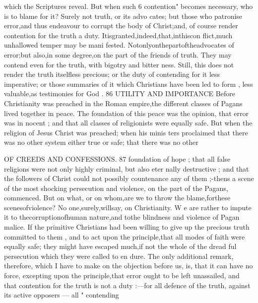 \documentclass[
]{book}
\begin{document}
which the Scriptures reveal. But when such 6 contention" becomes necessary, who is to
blame for it? Surely not truth, or its advo cates; but those who patronise error,and thus
endeavour to corrupt the body of Christ;and, of course render contention for the truth a
duty. Itisgranted,indeed,that,inthiscon flict,much unhallowed temper may be mani fested. Notonlyonthepartoftheadvocates of error;but also,in some degree,on the part of the friends of truth. They may contend even for the truth, with bigotry and bitter ness. Still, this does not render the truth
itselfless precious; or the duty of contending for it less imperative; or those summaries of it which Christians have been led to form , less valuable,as testimonies for God .
86 UTILITY AND IMPORTANCE
Before Christianity was preached in the
Roman empire,the different classes of Pagans lived together in peace. The foundation of
this peace was the opinion, that error was in nocent ; and that all classes of religionists were equally safe. But when the religion of Jesus Christ was preached; when his minis ters proclaimed that there was no other system
either true or safe; that there was no other

OF CREEDS AND CONFESSIONS. 87
foundation of hope ; that all false religions were not only highly criminal, but also eter nally destructive ; and that the followers of
Christ could not possibly countenance any of
them ;-thens a scene of the most shocking
persecution and violence, on the part of the
Pagans, commenced. But on what, or on
whom,are we to throw the blame,forthese
scenesofviolence? No one,surely,willsay,
on Christianity. W e are rather to impute it
to thecorruptionofhuman nature,and tothe
blindness and violence of Pagan malice. If
the primitive Christians had been willing to
give up the precious truth committed to them ,
and to act upon the principle,that all modes
of faith were equally safe; they might have
escaped much,if not the whole of the dread
ful persecution which they were called to en dure.
The only additional remark, therefore, which I have to make on the objection before us, is, that it can have no force, excepting upon the principle,that error ought to be left unassailed, and that contention for the truth
is not a duty :---for all defence of the truth, against its active opposers --- all " contending
\end{document}
